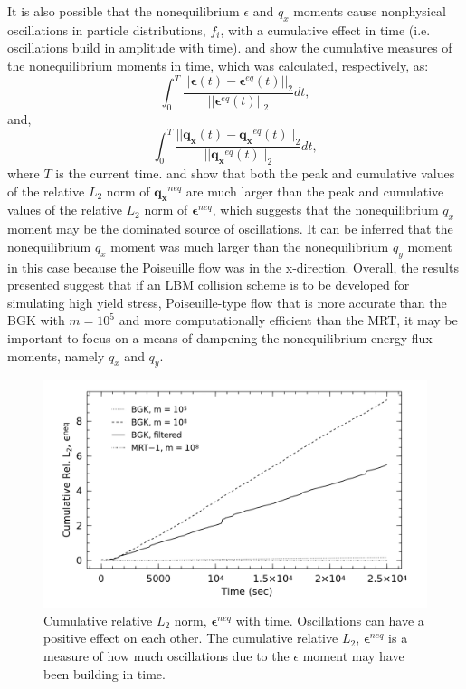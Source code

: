 It is also possible that the nonequilibrium $\epsilon$ and $q_x$ moments cause nonphysical oscillations in particle distributions, $f_i$, with a cumulative effect in time (i.e. oscillations build in amplitude with time).
 and  show the cumulative measures of the nonequilibrium moments in time, which was calculated, respectively, as:
\begin{equation}
  \int_0^{T} \frac{||\boldsymbol{\epsilon}(t) - \boldsymbol{\epsilon}^{eq}(t)||_2}{||\boldsymbol{\epsilon}^{eq}(t)||_2} dt,
\end{equation}
\noindent and,
\begin{equation}
  \int_0^{T} \frac{||\mathbf{q_x}(t) - \mathbf{q_x}^{eq}(t)||_2}{||\mathbf{q_x}^{eq}(t)||_2} dt,
\end{equation}
\noindent where $T$ is the current time. 
 and  show that both the peak and cumulative values of the relative $L_2$ norm of $\mathbf{q_x}^{neq}$ are much larger than the peak and cumulative values of the relative $L_2$ norm of $\boldsymbol{\epsilon}^{neq}$, which suggests that the nonequilibrium $q_x$ moment may be the dominated source of oscillations.
It can be inferred that the nonequilibrium $q_x$ moment was much larger than the nonequilibrium $q_y$ moment in this case because the Poiseuille flow was in the x-direction.
Overall, the results presented suggest that if an LBM collision scheme is to be developed for simulating high yield stress, Poiseuille-type flow that is more accurate than the BGK with $m = 10^5$ and more computationally efficient than the MRT, it may be important to focus on a means of dampening the nonequilibrium energy flux moments, namely $q_x$ and $q_y$.

\begin{figure}
    \includegraphics[width=\linewidth]{figs/poise-bingham/epsilon_cumulative}
    \caption{Cumulative relative $L_2$ norm, $\boldsymbol{\epsilon}^{neq}$ with time. Oscillations can have a positive effect on each other. The cumulative relative $L_2$, $\boldsymbol{\epsilon}^{neq}$ is a measure of how much oscillations due to the $\epsilon$ moment may have been building in time.}
    \label{fig:epsilon-cumulative}
\end{figure}

